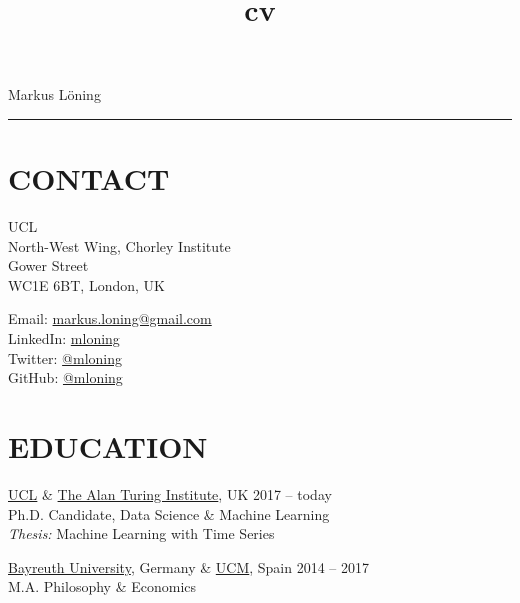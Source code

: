 \documentclass{cv}
\title{cv}
\begin{document}
{\LARGE Markus Löning}
\vspace{12pt}
\hrule

\section{CONTACT}

\begin{minipage}{.44\textwidth}
\vspace{3pt}
{\raggedright{} UCL \\
North-West Wing, Chorley Institute \\
Gower Street \\
WC1E 6BT, London, UK}
\end{minipage}
\hspace{1.25cm}
\begin{minipage}{.44\textwidth}
\vspace{3pt}
Email: \href{mailto:markus.loning@gmail.com}{markus.loning@gmail.com} \\
LinkedIn: \href{https://linkedin.com/in/mloning}{mloning} \\
Twitter: \href{https://twitter.com/mloning_}{@mloning\textunderscore} \\
GitHub: \href{https://github.com/mloning}{@mloning}
\end{minipage}


\section{EDUCATION}

\href{https://www.ucl.ac.uk/}{UCL} \& \href{https://www.turing.ac.uk/}{The Alan Turing Institute}, UK \hfill 2017 -- today \\
Ph.D. Candidate, Data Science \& Machine Learning \\
{\color{lightgray} \emph{Thesis:} Machine Learning with Time Series} %
\vspace{15pt}

\href{https://www.uni-bayreuth.de/en/}{Bayreuth University}, Germany \& \href{https://www.ucm.es/english}{UCM}, Spain \hfill 2014 -- 2017 \\
M.A. Philosophy \& Economics 
\vspace{15pt}
\end{document}
